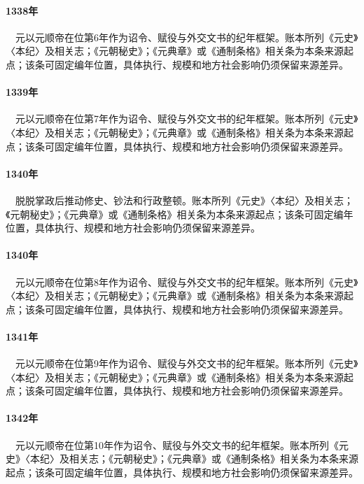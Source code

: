 \paragraph{1338年}　元以元顺帝在位第6年作为诏令、赋役与外交文书的纪年框架。账本所列《元史》〈本纪〉及相关志；《元朝秘史》；《元典章》或《通制条格》相关条为本条来源起点；该条可固定编年位置，具体执行、规模和地方社会影响仍须保留来源差异。

\paragraph{1339年}　元以元顺帝在位第7年作为诏令、赋役与外交文书的纪年框架。账本所列《元史》〈本纪〉及相关志；《元朝秘史》；《元典章》或《通制条格》相关条为本条来源起点；该条可固定编年位置，具体执行、规模和地方社会影响仍须保留来源差异。

\paragraph{1340年}　脱脱掌政后推动修史、钞法和行政整顿。账本所列《元史》〈本纪〉及相关志；《元朝秘史》；《元典章》或《通制条格》相关条为本条来源起点；该条可固定编年位置，具体执行、规模和地方社会影响仍须保留来源差异。

\paragraph{1340年}　元以元顺帝在位第8年作为诏令、赋役与外交文书的纪年框架。账本所列《元史》〈本纪〉及相关志；《元朝秘史》；《元典章》或《通制条格》相关条为本条来源起点；该条可固定编年位置，具体执行、规模和地方社会影响仍须保留来源差异。

\paragraph{1341年}　元以元顺帝在位第9年作为诏令、赋役与外交文书的纪年框架。账本所列《元史》〈本纪〉及相关志；《元朝秘史》；《元典章》或《通制条格》相关条为本条来源起点；该条可固定编年位置，具体执行、规模和地方社会影响仍须保留来源差异。

\paragraph{1342年}　元以元顺帝在位第10年作为诏令、赋役与外交文书的纪年框架。账本所列《元史》〈本纪〉及相关志；《元朝秘史》；《元典章》或《通制条格》相关条为本条来源起点；该条可固定编年位置，具体执行、规模和地方社会影响仍须保留来源差异。

